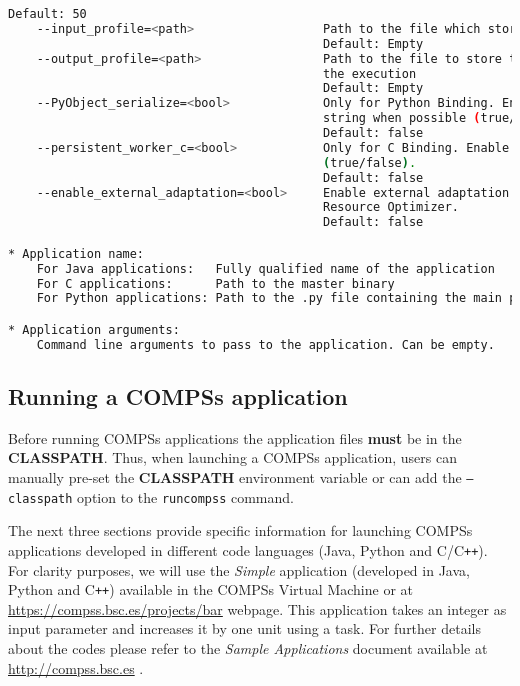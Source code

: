 \begin{lstlisting}[language=bash]
                                            Default: 50
    --input_profile=<path>                  Path to the file which stores the input application profile
                                            Default: Empty
    --output_profile=<path>                 Path to the file to store the application profile at the end of
                                            the execution
                                            Default: Empty 
    --PyObject_serialize=<bool>             Only for Python Binding. Enable the object serialization to
                                            string when possible (true/false).
                                            Default: false
    --persistent_worker_c=<bool>            Only for C Binding. Enable the persistent worker in c
                                            (true/false).
                                            Default: false
    --enable_external_adaptation=<bool>     Enable external adaptation. This option will disable the
                                            Resource Optimizer.
                                            Default: false

* Application name:
    For Java applications:   Fully qualified name of the application
    For C applications:      Path to the master binary
    For Python applications: Path to the .py file containing the main program

* Application arguments:
    Command line arguments to pass to the application. Can be empty.

\end{lstlisting}

\subsection{Running a COMPSs application}
\label{subsec:running_compss}
Before running COMPSs applications the application files \textbf{must} be in the \textbf{CLASSPATH}.
Thus, when launching a COMPSs application, users can manually pre-set the \textbf{CLASSPATH} environment variable
or can add the \texttt{--classpath} option to the \texttt{runcompss} command.

The next three sections provide specific information for launching COMPSs applications developed in different code languages (Java, Python and 
C/C\texttt{++}). For clarity purposes, we will use the \textit{Simple} application (developed in Java, Python and C\texttt{++}) available in the COMPSs
Virtual Machine or at \url{https://compss.bsc.es/projects/bar} webpage. This application takes an integer as input
parameter and increases it by one unit using a task. For further details about the codes please refer to the \textit{Sample 
Applications} document available at \url{http://compss.bsc.es} .

